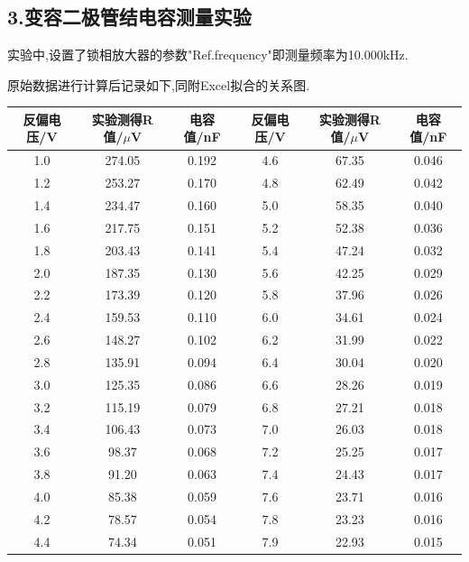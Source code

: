 \documentclass{article}
\begin{document}
\raggedright

\subsection*{3.变容二极管结电容测量实验}
实验中,设置了锁相放大器的参数"Ref.frequency"即测量频率为10.000kHz.

原始数据进行计算后记录如下,同附Excel拟合的关系图.

\clearpage
\centering
{}        %
\label{tab:tab1}
\begin{tabular}{c|c|c|c|c|c} 
	\hline
	反偏电压/V & 实验测得R值/$\mu$V & 电容值/nF & 反偏电压/V & 实验测得R值/$\mu$V & 电容值/nF \\ 
	\hline
	1.0 & 274.05 & 0.192 & 4.6 & 67.35 & 0.046 \\
	\hline
	1.2 & 253.27 & 0.170 & 4.8 & 62.49 & 0.042 \\
	\hline
	1.4 & 234.47 & 0.160 & 5.0 & 58.35 & 0.040 \\
	\hline
	1.6 & 217.75 & 0.151 & 5.2 & 52.38 & 0.036 \\
	\hline
	1.8 & 203.43 & 0.141 & 5.4 & 47.24 & 0.032 \\
	\hline
	2.0 & 187.35 & 0.130 & 5.6 & 42.25 & 0.029 \\
	\hline
	2.2 & 173.39 & 0.120 & 5.8 & 37.96 & 0.026 \\
	\hline
	2.4 & 159.53 & 0.110 & 6.0 & 34.61 & 0.024 \\
	\hline
	2.6 & 148.27 & 0.102 & 6.2 & 31.99 & 0.022 \\
	\hline
	2.8 & 135.91 & 0.094 & 6.4 & 30.04 & 0.020 \\
	\hline
	3.0 & 125.35 & 0.086 & 6.6 & 28.26 & 0.019 \\
	\hline
	3.2 & 115.19 & 0.079 & 6.8 & 27.21 & 0.018 \\
	\hline
	3.4 & 106.43 & 0.073 & 7.0 & 26.03 & 0.018 \\
	\hline
	3.6 & 98.37 & 0.068 & 7.2 & 25.25 & 0.017 \\
	\hline
	3.8 & 91.20 & 0.063 & 7.4 & 24.43 & 0.017 \\
	\hline
	4.0 & 85.38 & 0.059 & 7.6 & 23.71 & 0.016 \\
	\hline
	4.2 & 78.57 & 0.054 & 7.8 & 23.23 & 0.016 \\
	\hline
	4.4 & 74.34 & 0.051 & 7.9 & 22.93 & 0.015 \\
	\hline	
\end{tabular}
\raggedright
\end{document}
